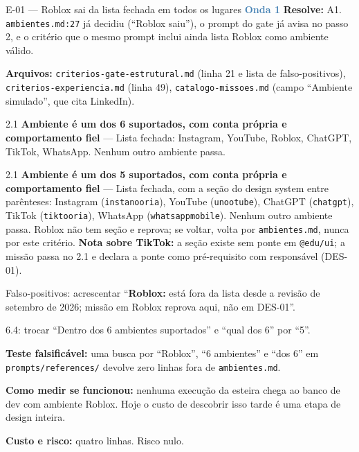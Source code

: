\documentclass[11pt,a4paper]{article}
\newcommand{\onda}[1]{\textcolor{SteelBlue}{\textbf{Onda #1}}}
\begin{document}
\begin{emendabox}{E-01 --- Roblox sai da lista fechada em todos os lugares \hfill \onda{1}}
\textbf{Resolve:} A1. \texttt{ambientes.md:27} já decidiu (``Roblox saiu''), o prompt do gate
já avisa no passo 2, e o critério que o mesmo prompt inclui ainda lista Roblox como ambiente
válido.

\textbf{Arquivos:} \texttt{criterios-gate-estrutural.md} (linha 21 e lista de falso-positivos),
\texttt{criterios-experiencia.md} (linha 49), \texttt{catalogo-missoes.md} (campo ``Ambiente
simulado'', que cita LinkedIn).

\begin{antesbox}\small
2.1 \textbf{Ambiente é um dos 6 suportados, com conta própria e comportamento fiel} --- Lista
fechada: Instagram, YouTube, Roblox, ChatGPT, TikTok, WhatsApp. Nenhum outro ambiente passa.
\end{antesbox}

\begin{depoisbox}\small
2.1 \textbf{Ambiente é um dos 5 suportados, com conta própria e comportamento fiel} --- Lista
fechada, com a seção do design system entre parênteses: Instagram (\texttt{instanooria}), YouTube
(\texttt{unootube}), ChatGPT (\texttt{chatgpt}), TikTok (\texttt{tiktooria}), WhatsApp
(\texttt{whatsappmobile}). Nenhum outro ambiente passa. Roblox não tem seção e reprova; se voltar,
volta por \texttt{ambientes.md}, nunca por este critério. \textbf{Nota sobre TikTok:} a seção
existe sem ponte em \texttt{@edu/ui}; a missão passa no 2.1 e declara a ponte como pré-requisito
com responsável (DES-01).

Falso-positivos: acrescentar ``\textbf{Roblox:} está fora da lista desde a revisão de setembro de
2026; missão em Roblox reprova aqui, não em DES-01''.

6.4: trocar ``Dentro dos 6 ambientes suportados'' e ``qual dos 6'' por ``5''.
\end{depoisbox}

\textbf{Teste falsificável:} uma busca por ``Roblox'', ``6 ambientes'' e ``dos 6'' em
\texttt{prompts/references/} devolve zero linhas fora de \texttt{ambientes.md}.

\textbf{Como medir se funcionou:} nenhuma execução da esteira chega ao banco de dev com ambiente
Roblox. Hoje o custo de descobrir isso tarde é uma etapa de design inteira.

\textbf{Custo e risco:} quatro linhas. Risco nulo.
\end{emendabox}
\end{document}

